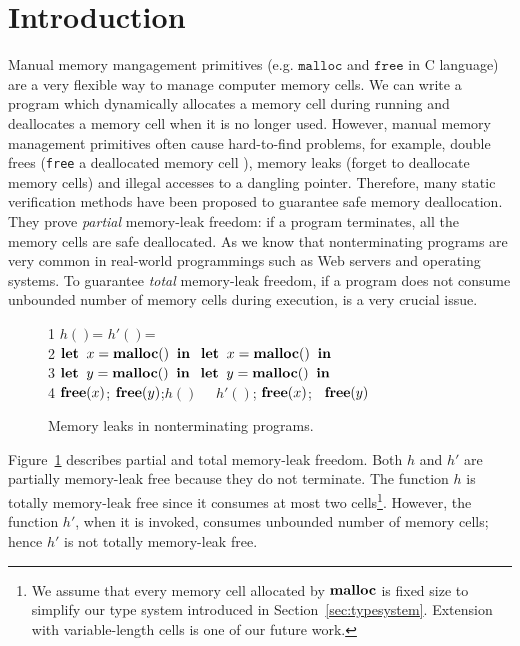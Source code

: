 \section{Introduction}
\label{sec:introduction}
Manual memory mangagement primitives (e.g. \(\texttt{malloc}\) and
\(\texttt{free}\) in C language) are a very flexible way to manage
computer memory cells.  We can write a program which dynamically
allocates a memory cell during running and deallocates a memory cell
when it is no longer used. However, manual memory management
primitives often cause hard-to-find problems, for example, double
frees (\texttt{free} a deallocated memory cell ), memory leaks (forget
to deallocate memory cells) and illegal accesses to a dangling
pointer. Therefore, many static verification methods have been
proposed to guarantee safe memory deallocation. They prove
\emph{partial} memory-leak freedom: if a program terminates, all the
memory cells are safe deallocated. As we know that nonterminating
programs are very common in real-world programmings such as Web
servers and operating systems. To guarantee \emph{total} memory-leak
freedom, if a program does not consume unbounded number of memory
cells during execution, is a very crucial issue.

\begin{exmp}\label{ex:ex1}
\begin{figure}[h]
1  \Rtab $h()$= \dtb \dtb\dtb\Rtab$h'()$= \\
2  \dtb $\mathbf{let}\; \; x = \mathbf{malloc()}\;  \; \mathbf{in}\;$ \dtb \Rtab$\mathbf{let}\; \; x = \mathbf{malloc()}\;  \; \mathbf{in}\;$\\
3  \dtb $\mathbf{let}\; \; y = \mathbf{malloc()}\;  \; \mathbf{in}\;$ \dtb \Rtab$\mathbf{let}\; \; y = \mathbf{malloc()}\;  \; \mathbf{in}\;$\\
4  \dtb $\mathbf{free}(x)$; $\mathbf{free}(y) $;\;$h()$ \dtb \Rtab\ \ $h'()$; $\mathbf{free}(x)$; \ $\mathbf{free}(y)$
\caption{Memory leaks in nonterminating programs.}
\label{ex:np}
\end{figure}
Figure~\ref{ex:np} describes partial and total memory-leak freedom.
Both \(h\) and \(h'\) are partially memory-leak free because they do
not terminate.  The function \(h\) is totally memory-leak free since
it consumes at most two cells\footnote{We assume that every memory
  cell allocated by \(\mathbf{malloc}\) is fixed size to simplify our type
  system introduced in Section~\ref{sec:typesystem}.  Extension with
  variable-length cells is one of our future work.}.  However, the
function \(h'\), when it is invoked, consumes unbounded number of
memory cells; hence \(h'\) is not totally memory-leak free.
\end{exmp}

